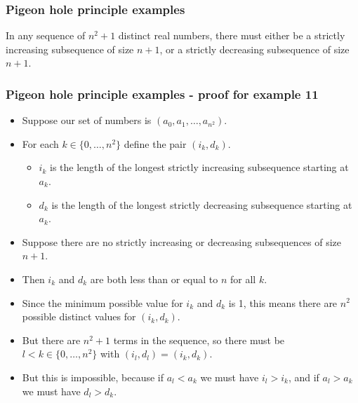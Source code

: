 \documentclass[handout]{beamer}
\begin{document}
\begin{frame}
\frametitle{Pigeon hole principle examples}
\begin{example}
In any sequence of $n^2+1$ distinct real numbers, there must either be a strictly increasing subsequence of size $n+1$, or a strictly decreasing subsequence of size $n+1$.
\end{example}
\end{frame}

\begin{frame}
\frametitle{Pigeon hole principle examples - proof for example 11}
\begin{itemize}
\item Suppose our set of numbers is $(a_0,a_1,\ldots,a_{n^2})$. 
\item For each $k\in\{0,\ldots,n^2\}$ define the pair $(i_k,d_k)$. 
\begin{itemize}
\item $i_k$ is the length of the longest strictly increasing subsequence starting at $a_k$.
\item $d_k$ is the length of the longest strictly decreasing subsequence starting at $a_k$. 
\end{itemize}
\item Suppose there are no strictly increasing or decreasing subsequences of size $n+1$. 
\item Then $i_k$ and $d_k$ are both less than or equal to $n$ for all $k$. 
\item Since the minimum possible value for $i_k$ and $d_k$ is 1, this means there are $n^2$ possible distinct values for $(i_k,d_k)$. 
\item But there are $n^2+1$ terms in the sequence, so there must be $l<k\in\{0,\ldots,n^2\}$ with $(i_l,d_l)=(i_k,d_k)$. 
\item But this is impossible, because if $a_l<a_k$ we must have $i_l>i_k$, and if $a_l > a_k$ we must have $d_l > d_k$. 
\end{itemize}
\end{frame}
\end{document}
